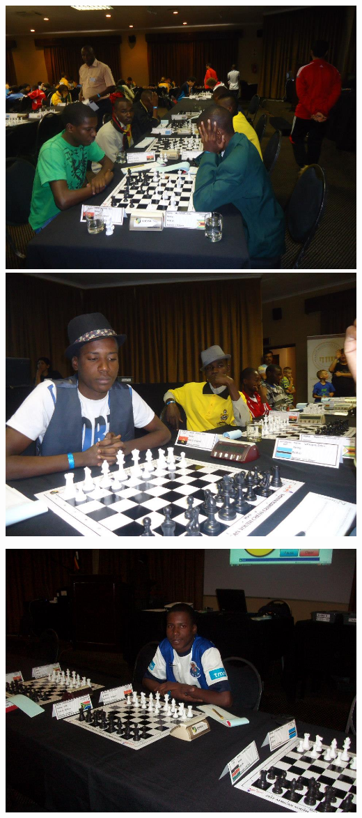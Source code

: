 \begin{center}
  \begin{figurebox}
 \begin{center}  \includegraphics[scale=0.2]{jugando3.jpg}
   \includegraphics[scale=0.2]{fotoJoao.jpg}\end{center}
 \begin{center}  \includegraphics[scale=0.2]{fotoJoao2.jpg}

\end{center}
\end{figurebox}
\end{center}
